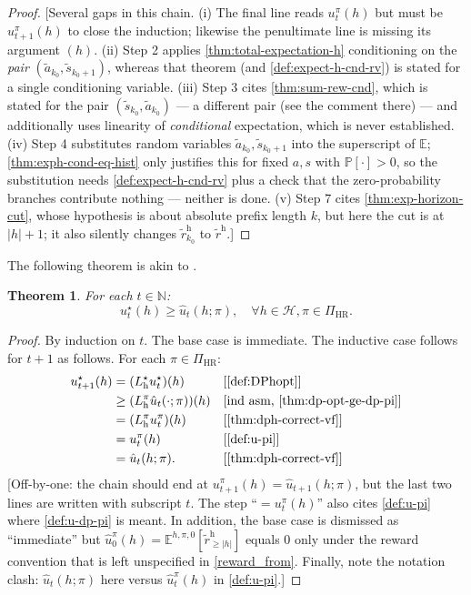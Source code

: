 \documentclass[letterpaper]{article}
\theoremstyle{plain}
\newtheorem{theorem}{Theorem}[subsection]
\theoremstyle{definition}
\theoremstyle{remark}
\newcommand{\Nats}{\mathbb{N}}
\newcommand{\E}{\mathbb{E}}
\newcommand{\PP}{\mathbb{P}}
\newcommand{\opt}{^{\star}}
\newcommand{\PiHR}{\Pi_{\mathrm{HR}}}
\newcommand{\rew}{\tilde{r}^{\mathrm{h}}}
\newcommand{\why}[1]{\text{[#1]}}
\newcommand{\cc}[1]{\textcolor{ccolor}{[#1]}}
\newcommand{\lean}[1]{\textcolor{blue}{(\emph{LEAN}: \texttt{#1})}}
\begin{document}
\begin{proof}
\cc{Several gaps in this chain. (i) The final line reads $u^{\pi}_t(h)$ but must be $u^{\pi}_{t+1}(h)$ to close the induction; likewise the penultimate line is missing its argument $(h)$. (ii) Step 2 applies \cref{thm:total-expectation-h} conditioning on the \emph{pair} $(\tilde{a}_{k_0},\tilde{s}_{k_0+1})$, whereas that theorem (and \cref{def:expect-h-cnd-rv}) is stated for a single conditioning variable. (iii) Step 3 cites \cref{thm:sum-rew-cnd}, which is stated for the pair $(\tilde{s}_{k_0},\tilde{a}_{k_0})$ --- a different pair (see the comment there) --- and additionally uses linearity of \emph{conditional} expectation, which is never established. (iv) Step 4 substitutes random variables $\tilde{a}_{k_0},\tilde{s}_{k_0+1}$ into the superscript of $\E$; \cref{thm:exph-cond-eq-hist} only justifies this for fixed $a,s$ with $\PP[\cdot]>0$, so the substitution needs \cref{def:expect-h-cnd-rv} plus a check that the zero-probability branches contribute nothing --- neither is done. (v) Step 7 cites \cref{thm:exp-horizon-cut}, whose hypothesis is about absolute prefix length $k$, but here the cut is at $|h|+1$; it also silently changes $\rew_{k_0}$ to $\rew$.}
\end{proof}

The following theorem is akin to \citep[theorem~4.3.2]{Puterman2005}.
\begin{theorem}\label{thm:dph-opt-vf-opt}
For each $t\in \Nats$:
  \[
    u\opt_t(h)
    \ge 
    \hat{u}_t(h; \pi), \quad \forall h\in \mathcal{H}, \pi\in \PiHR.
  \]
\end{theorem}
\begin{proof}
  By induction on $t$. The base case is immediate. The inductive case follows for $t+1$ as follows. For each $\pi\in \PiHR$:
  \begin{align*}
    u_{t+1}\opt(h)
    &= (L_{\mathrm{h}}\opt u_t\opt)(h) && \why{\cref{def:DPhopt}} \\
    &\ge (L_{\mathrm{h}}^{\pi} \hat{u}_t(\cdot; \pi))(h) && \why{ind asm, \cref{thm:dp-opt-ge-dp-pi}} \\
    &= (L_{\mathrm{h}}^{\pi} u_t^{\pi})(h) && \why{\cref{thm:dph-correct-vf}} \\
    &= u_t^{\pi}(h) && \why{\cref{def:u-pi}} \\
    &= \hat{u}_t(h; \pi). && \why{\cref{thm:dph-correct-vf}} \\
  \end{align*}
\cc{Off-by-one: the chain should end at $u^{\pi}_{t+1}(h) = \hat{u}_{t+1}(h;\pi)$, but the last two lines are written with subscript $t$. The step ``$= u^{\pi}_t(h)$'' also cites \cref{def:u-pi} where \cref{def:u-dp-pi} is meant. In addition, the base case is dismissed as ``immediate'' but $\hat{u}^{\pi}_0(h) = \E^{h,\pi,0}[\rew_{\ge|h|}]$ equals $0$ only under the reward convention that is left unspecified in \cref{reward_from}. Finally, note the notation clash: $\hat{u}_t(h;\pi)$ here versus $\hat{u}^{\pi}_t(h)$ in \cref{def:u-pi}.}
\end{proof}
\end{document}
